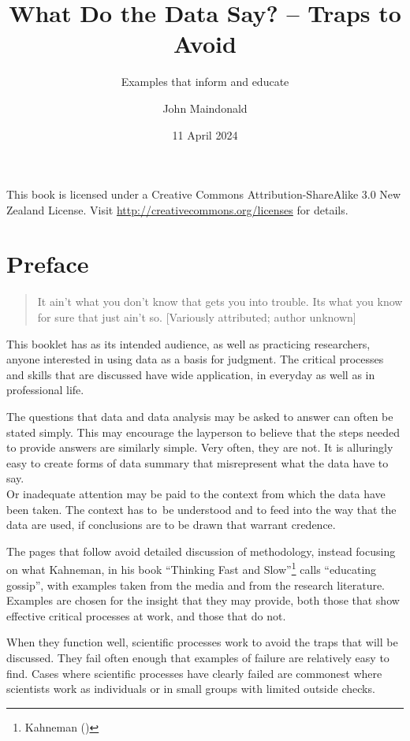 \documentclass[
  10ptls,
  b5paper]{book}
\title{What Do the Data Say? -- Traps to Avoid}
\subtitle{Examples that inform and educate}
\author{John Maindonald}
\date{11 April 2024}
\begin{document}
\maketitle

\newpage
This book is licensed under a Creative
Commons Attribution-ShareAlike 3.0 New Zealand License.
Visit \url{http://creativecommons.org/licenses} for details.


{
\hypersetup{linkcolor=}
\setcounter{tocdepth}{1}
\tableofcontents
}
\renewcommand{\bibname}{References}

\chapter*{Preface}\label{preface}

\begin{quote}
It ain't what you don't know that gets you into trouble.
Its what you know for sure that just ain't so.
{[}Variously attributed; author unknown{]}
\end{quote}

This booklet has as its intended audience, as well as practicing
researchers, anyone interested in using data as a basis for
judgment. The critical processes and skills that are discussed
have wide application, in everyday as well as in professional life.

The questions that data and data analysis may be asked to answer can
often be stated simply. This may encourage the layperson to believe
that the steps needed to provide answers are similarly simple.
Very often, they are not. It is alluringly easy to create forms of
data summary that misrepresent what the data have to say.\\
Or inadequate attention may be paid to the context from which the
data have been taken. The context has to~be understood and to feed
into the way that the data are used, if conclusions are to be drawn
that warrant credence.

The pages that follow avoid detailed discussion of methodology,
instead focusing on what Kahneman, in his book
``Thinking Fast and Slow''\footnote{Kahneman ()} calls ``educating gossip'',
with examples taken from the media and from the research literature.
Examples are chosen for the insight that they may provide, both
those that show effective critical processes at work, and those
that do not.

When they function well, scientific processes work to avoid the
traps that will be discussed. They fail often enough that examples
of failure are relatively easy to find. Cases where scientific
processes have clearly failed are commonest where scientists work
as individuals or in small groups with limited outside checks.
\end{document}
